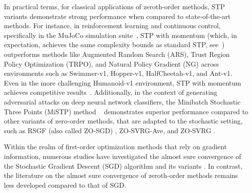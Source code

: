 \documentclass{article} %
\begin{document}




In practical terms, for classical applications of zeroth-order methods, STP variants demonstrate strong performance when compared to state-of-the-art methods. For instance, in reinforcement learning and continuous control, specifically in the MuJoCo simulation suite~\citep{6386109}, STP with momentum (which, in expectation, achieves the same complexity bounds as standard STP, see~\cite{gorbunov2020momentum}) outperforms methods like Augmented Random Search (ARS), Trust Region Policy Optimization (TRPO), and Natural Policy Gradient (NG) across environments such as Swimmer-v1, Hopper-v1, HalfCheetah-v1, and Ant-v1. Even in the more challenging Humanoid-v1 environment, STP with momentum achieves competitive results~\citep{gorbunov2020momentum}. Additionally, in the context of generating adversarial attacks on deep neural network classifiers, the Minibatch Stochastic Three Points (MiSTP)  method ~\citep{boucherouite2024minibatch} demonstrates superior performance compared to other variants of zero-order methods, that are adapted to the stochastic setting, such as RSGF (also called ZO-SGD) \citep{ghadimi2013stochastic}, ZO-SVRG-Ave, and ZO-SVRG \citep{liu2018zeroth}.


Within the realm of first-order optimization methods that rely on gradient information, numerous studies have investigated the almost sure convergence of the Stochastic Gradient Descent (SGD)  algorithm and its variants \citep{bertsekas2000gradient, nguyen2019new, mertikopoulos2020almost, sebbouh2021almost, liu2022almost}. In contrast, the literature on the almost sure convergence of zeroth-order methods remains less developed compared to that of SGD. 
\end{document}
